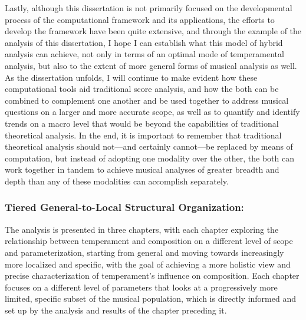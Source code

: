 Lastly, although this dissertation is not primarily focused on the
developmental process of the computational framework and its
applications, the efforts to develop the framework have been quite
extensive, and through the example of the analysis of this dissertation,
I hope I can establish what this model of hybrid analysis can achieve,
not only in terms of an optimal mode of temperamental analysis, but also
to the extent of more general forms of musical analysis as well. As the
dissertation unfolds, I will continue to make evident how these
computational tools aid traditional score analysis, and how the both can
be combined to complement one another and be used together to address
musical questions on a larger and more accurate scope, as well as to
quantify and identify trends on a macro level that would be beyond the
capabilities of traditional theoretical analysis. In the end, it is
important to remember that traditional theoretical analysis should
not---and certainly cannot---be replaced by means of
computation, but instead of adopting one modality over the other, the
both can work together in tandem to achieve musical analyses of greater
breadth and depth than any of these modalities can accomplish
separately.

\subsubsection{Tiered General-to-Local Structural
Organization:}\label{tiered-general-to-local-structural-organization}

The analysis is presented in three chapters, with each chapter exploring
the relationship between temperament and composition on a different
level of scope and parameterization, starting from general and moving
towards increasingly more localized and specific, with the goal of
achieving a more holistic view and precise characterization of
temperament's influence on composition. Each chapter focuses on a
different level of parameters that looks at a progressively more
limited, specific subset of the musical population, which is directly
informed and set up by the analysis and results of the chapter preceding
it.

